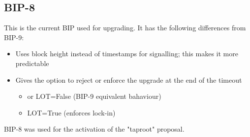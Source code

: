 \subsection*{BIP-8}
This is the current BIP used for upgrading. It has the following differences from BIP-9:
\begin{itemize}
	\item Uses block height instead of timestamps for signalling; this makes it more predictable
	\item Gives the option to reject or enforce the upgrade at the end of the timeout
	\begin{itemize}
		\item {} or LOT=False (BIP-9 equivalent bahaviour)
		\item LOT=True (enforces lock-in)
	\end{itemize}
\end{itemize}

BIP-8 was used for the activation of the "taproot" proposal. 



